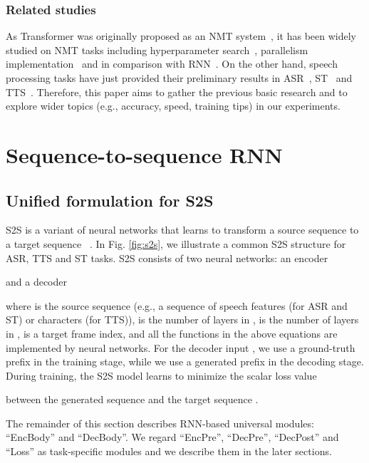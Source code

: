\subsubsection*{Related studies}


As Transformer was originally proposed as an NMT system~\cite{VaswaniNIPS2017_7181}, it has been widely studied on NMT tasks including hyperparameter search~\cite{DBLP:journals/pbml/PopelB18}, parallelism implementation~\cite{ott-etal-2018-scaling} and in comparison with RNN~\cite{lakew-etal-2018-comparison}.
On the other hand, speech processing tasks have just provided their preliminary results in ASR~\cite{speech-transformer,Zhou2018}, ST~\cite{CrossVila2018} and TTS~\cite{li2019close}.
Therefore, this paper aims to gather the previous basic research and to explore wider topics (e.g., accuracy, speed, training tips) in our experiments.




\section{Sequence-to-sequence RNN}
\label{sec:s2s}

\subsection{Unified formulation for S2S}

S2S is a variant of neural networks that learns to transform a source sequence  to a target sequence ~\cite{s2s_NIPS2014_5346}.
In Fig. \ref{fig:s2s}, we illustrate a common S2S structure for ASR, TTS and ST tasks.
S2S consists of two neural networks: an encoder

and a decoder

where  is the source sequence (e.g., a sequence of speech features (for ASR and ST) or characters (for TTS)),  is the number of  layers in ,  is the number of  layers in ,  is a target frame index, and all the functions in the above equations are implemented by neural networks. 
For the decoder input , we use a ground-truth prefix in the training stage, while we use a generated prefix in the decoding stage.
During training, the S2S model learns to minimize the scalar loss value

between the generated sequence  and the target sequence .

The remainder of this section describes RNN-based universal modules: ``EncBody'' and ``DecBody''. We regard  ``EncPre'', ``DecPre'', ``DecPost'' and ``Loss'' as task-specific modules and we describe them in the later sections.


